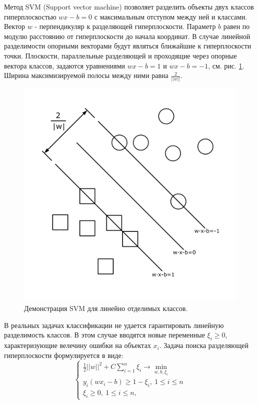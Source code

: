 \documentclass[14pt]{extarticle}
\begin{document}
\par
Метод SVM (Support vector machine) позволяет разделить объекты двух классов
гиперплоскостью $wx-b=0$ с максимальным отступом между ней и классами.
Вектор $w$ - перпендикуляр к разделяющей гиперплоскости.
Параметр $b$ равен по модулю расстоянию от гиперплоскости до начала координат.
В случае линейной разделимости опорными векторами будут являться ближайшие
к гиперплоскости точки.
Плоскости, параллельные разделяющей и проходящие через опорные вектора классов,
задаются уравнениями $wx-b=1$ и $wx-b=-1$, см. рис. \ref{image:svm_linear}.
Ширина максимизируемой полосы между ними равна $\frac{2}{||w||}.$
\begin{figure}[H]
\centering
\includegraphics[width=\linewidth]{imgs/svm_linear.png}
\caption{Демонстрация SVM для линейно отделимых классов.}
\label{image:svm_linear}
\end{figure}
\par
В реальных задачах классификации не удается гарантировать линейную разделимость классов.
В этом случае вводятся новые переменные $\xi_i \ge 0$, характеризующие велечину ошибки 
на объектах $x_i$. Задача поиска разделяющей гиперплоскости формулируется в виде:
\[\begin{cases}
    \frac{1}{2}||w||^2+C\sum_{i=1}^n\xi_i \to \min_{w, b, \xi_i} \\
    y_i(wx_i-b)\ge 1-\xi_i,\ 1 \le i \le n \\
    \xi_i \ge 0,\ 1 \le i \le n,
\end{cases}\]
\end{document}
